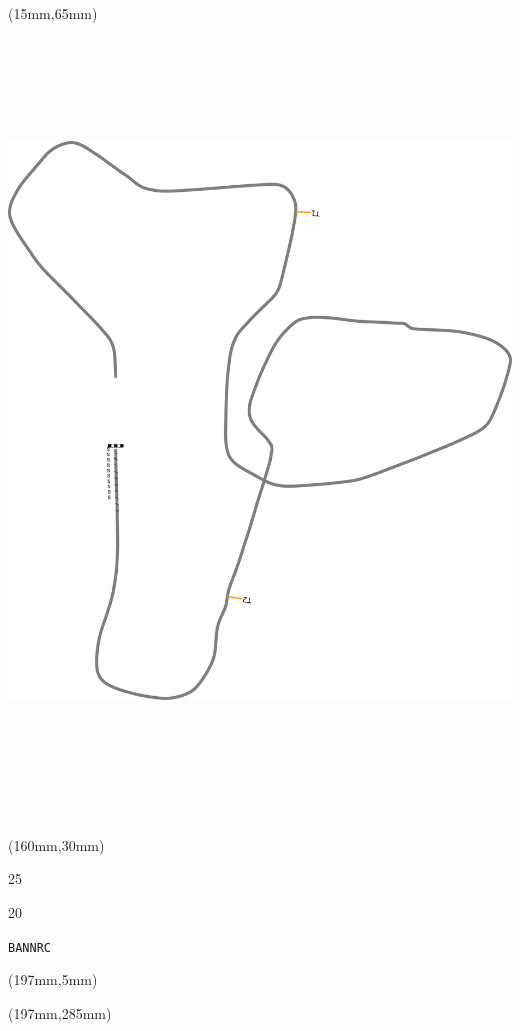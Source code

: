 \begin{textblock*}{185mm}(15mm,65mm)%
\centering
\mbox{\includegraphics[width=185mm,height=210mm,keepaspectratio]{PT/BANNRC.pdf}}
\end{textblock*}
\begin{textblock*}{40mm}(160mm,30mm)%
\Large
\par{} 
\par25 
\par20 
\par\hfill\tiny\tt BANNRC\\
\end{textblock*}
\begin{textblock*}{20mm}(197mm,5mm)%
\fbox{\thepage}
\label{BANNRC}
\end{textblock*}
\begin{textblock*}{20mm}(197mm,285mm)%
\fbox{\thepage}
\end{textblock*}

